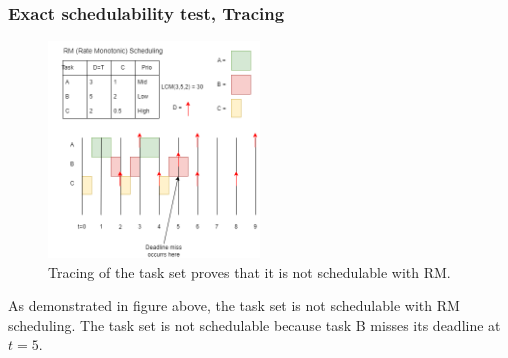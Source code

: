             \subsubsection{Exact schedulability test, Tracing}
            \begin{figure}[H]
                \centering
                \includegraphics[width=0.5\textwidth]{images/Ass1Q2.drawio.png}
                \caption{Tracing of the task set proves that it is not schedulable with RM.}
                \label{fig:tracing}
            \end{figure}

        As demonstrated in figure above, the task set is not schedulable with RM scheduling. The task set is not schedulable because task B misses its deadline at $t = 5$.
